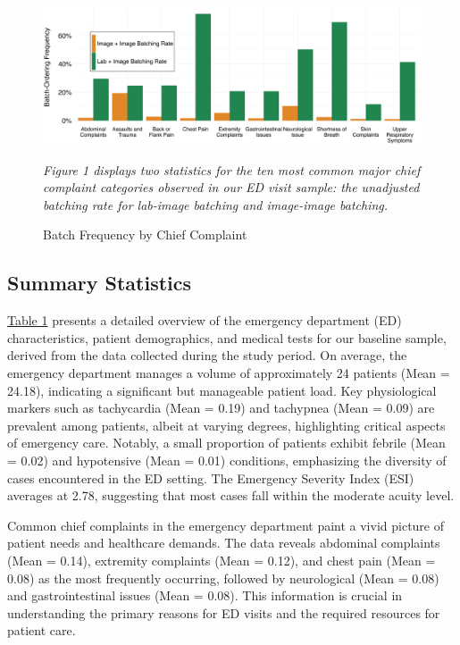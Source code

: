 \documentclass[,,nonblindrev]{informs}
\begin{document}
\begin{figure}[h]
  \centering
  \caption{Batch Frequency by Chief Complaint}
  \includegraphics[width=1\textwidth]{../outputs/figures/Lab and Image Batch Rates.png}
\begin{tablenotes}
\tiny
\item \textit{Figure 1 displays two statistics for the ten most common major chief complaint categories observed in our ED visit sample: the unadjusted batching rate for lab-image batching and image-image batching.}
\end{tablenotes}  
\end{figure}

\hypertarget{summary-statistics}{%
\subsection{Summary Statistics}\label{summary-statistics}}

\hyperref[tab:summary_statistics]{Table 1} presents a detailed overview
of the emergency department (ED) characteristics, patient demographics,
and medical tests for our baseline sample, derived from the data
collected during the study period. On average, the emergency department
manages a volume of approximately 24 patients (Mean = 24.18), indicating
a significant but manageable patient load. Key physiological markers
such as tachycardia (Mean = 0.19) and tachypnea (Mean = 0.09) are
prevalent among patients, albeit at varying degrees, highlighting
critical aspects of emergency care. Notably, a small proportion of
patients exhibit febrile (Mean = 0.02) and hypotensive (Mean = 0.01)
conditions, emphasizing the diversity of cases encountered in the ED
setting. The Emergency Severity Index (ESI) averages at 2.78, suggesting
that most cases fall within the moderate acuity level.

Common chief complaints in the emergency department paint a vivid
picture of patient needs and healthcare demands. The data reveals
abdominal complaints (Mean = 0.14), extremity complaints (Mean = 0.12),
and chest pain (Mean = 0.08) as the most frequently occurring, followed
by neurological (Mean = 0.08) and gastrointestinal issues (Mean = 0.08).
This information is crucial in understanding the primary reasons for ED
visits and the required resources for patient care.
\end{document}

